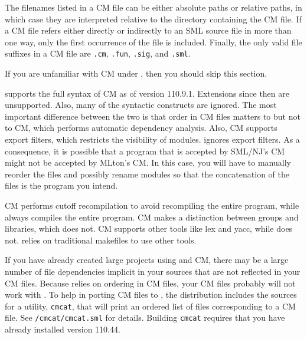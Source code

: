 The filenames listed in a CM file can be either absolute paths or
relative paths, in which case they are interpreted relative to the
directory containing the CM file.  If a CM file refers either directly
or indirectly to an SML source file in more than one way, only the
first occurrence of the file is included.  Finally, the only valid
file suffixes in a CM file are {\tt .cm}, {\tt .fun}, {\tt .sig}, and
{\tt .sml}.
%

If you are unfamiliar with CM under {\smlnj}, then you should skip this
section.

{\mlton} supports the full syntax of CM as of {\smlnj} version
110.9.1.  Extensions since then are unsupported.  Also, many of the
syntactic constructs are ignored.  The most important difference
between the two is that order in CM files matters to {\mlton} but not
to CM, which performs automatic dependency analysis.  Also, CM
supports export filters, which restricts the visibility of modules.
{\mlton} ignores export filters.  As a consequence, it is possible
that a program that is accepted by SML/NJ's CM might not be accepted
by MLton's CM.  In this case, you will have to manually reorder the
files and possibly rename modules so that the concatenation of the
files is the program you intend.

CM performs cutoff recompilation to avoid recompiling the entire
program, while {\mlton} always compiles the entire program.  CM makes
a distinction between groups and libraries, which {\mlton} does not.
CM supports other tools like lex and yacc, while {\mlton} does not.
{\mlton} relies on traditional makefiles to use other tools.
%

If you have already created large projects using {\smlnj} and CM,
there may be a large number of file dependencies implicit in your
sources that are not reflected in your CM files.  Because {\mlton}
relies on ordering in CM files, your CM files probably will not work
with {\mlton}.  To help in porting CM files to {\mlton}, the {\mlton}
distribution includes the sources for a utility, {\tt cmcat}, that
will print an ordered list of files corresponding to a CM file.  See
{\tt \doc/cmcat/cmcat.sml} for details.  Building {\tt cmcat} requires
that you have already installed {\smlnj} version 110.44.


